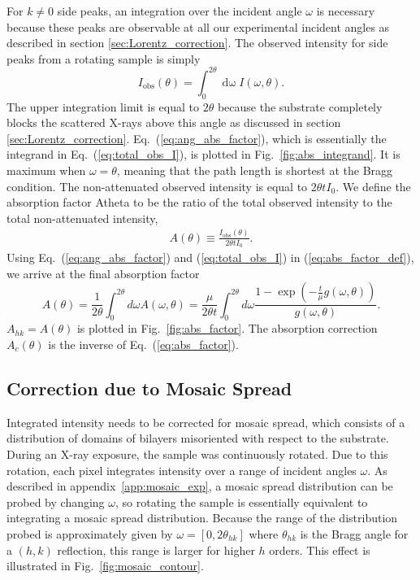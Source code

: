 For $k\neq 0$ side peaks, an integration over the incident angle $\omega$
is necessary because these peaks are observable at all our experimental incident angles as
described in section \ref{sec:Lorentz_correction}.
The observed intensity for side peaks from a rotating sample is simply
\begin{equation}
  I_\textrm{obs}(\theta) 
  = \int_0^{2\theta}\mathop{d\omega} I(\omega,\theta).
  \label{eq:total_obs_I}
\end{equation}
The upper integration limit is equal to $2\theta$ because the substrate
completely blocks the scattered X-rays above this angle as discussed in 
section \ref{sec:Lorentz_correction}. Eq.~(\ref{eq:ang_abs_factor}),
which is essentially the integrand in Eq.~(\ref{eq:total_obs_I}), is 
plotted in Fig.~\ref{fig:abs_integrand}. It is maximum when $\omega=\theta$,
meaning that the path length is shortest at the Bragg condition.
The non-attenuated observed intensity is equal to $2\theta t I_0$. We
define the absorption factor \gls{Atheta} to be the ratio of the total 
observed intensity to the total non-attenuated intensity,
\begin{align}
  A(\theta) \equiv \frac{I_\textrm{obs}(\theta)}{2\theta tI_0}. 
  \label{eq:abs_factor_def}
\end{align}
Using Eq.~(\ref{eq:ang_abs_factor}) and (\ref{eq:total_obs_I})
in (\ref{eq:abs_factor_def}), we arrive
at the final absorption factor
\begin{equation}
  A(\theta) = \frac{1}{2\theta}\int_0^{2\theta}d\omega A(\omega,\theta)
  = \frac{\mu}{2\theta t} \int_0^{2\theta}d\omega 
  \frac{1-\exp\left(-\frac{t}{\mu}g(\omega,\theta)\right)}{g(\omega,\theta)}.
  \label{eq:abs_factor}
\end{equation}
$A_{hk} = A(\theta)$ is plotted in Fig.~\ref{fig:abs_factor}.
The absorption correction $A_c(\theta)$ is the inverse of Eq.~(\ref{eq:abs_factor}). 

\subsection{Correction due to Mosaic Spread}\label{sec:mosaic_spread_correction}
Integrated intensity needs to be corrected for mosaic spread, which consists 
of a distribution of domains of bilayers misoriented with respect to the 
substrate. 
During an X-ray exposure, the sample
was continuously rotated. Due to this rotation, each pixel integrates 
intensity over a range of incident angles $\omega$.
As described in appendix~\ref{app:mosaic_exp}, 
a mosaic spread distribution can be probed
by changing $\omega$, so rotating the sample is essentially  
equivalent to integrating a mosaic spread distribution.
Because the range of the distribution probed is approximately given by 
$\omega=[0, 2\theta_{hk}]$ 
where $\theta_{hk}$ is the Bragg angle for a $(h,k)$ reflection, 
this range is larger for higher $h$ orders. 
This effect is illustrated in Fig.~\ref{fig:mosaic_contour}.

